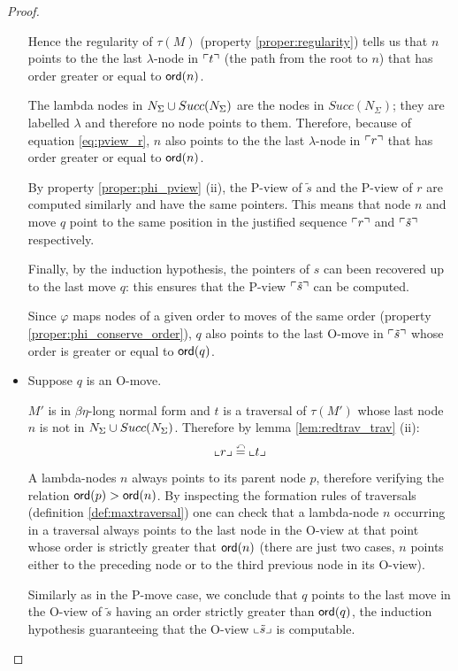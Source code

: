 \begin{proof}
\begin{itemize}
Hence the regularity of $\tau(M)$ (property \ref{proper:regularity}) tells us that $n$ points to the
the last $\lambda$-node in $\ulcorner t \urcorner$ (the path from the root to $n$) that has order greater or equal to ${\sf ord}(n)$.

The lambda nodes in $N_\Sigma \cup Succ(N_\Sigma)$ are the nodes in $Succ(N_{\Sigma})$; they are
labelled $\lambda$ and therefore no node points to them. Therefore, because of equation \ref{eq:pview_r},
$n$ also points to the the last $\lambda$-node in $\ulcorner r \urcorner$ that
has order greater or equal to ${\sf ord}(n)$.


By property \ref{proper:phi_pview} (ii), the P-view of $\tilde{s}$ and the P-view of $r$ are computed
similarly and have the same pointers. This means that
node $n$ and  move $q$ point to the same position in
the justified sequence $\ulcorner r \urcorner$ and $\ulcorner \tilde{s} \urcorner$ respectively.

Finally, by the induction hypothesis, the pointers of $s$ can been recovered up to the last move $q$: this
ensures that the P-view $\ulcorner \tilde{s} \urcorner$ can be computed.

Since $\varphi$ maps nodes of a given order to moves of the same order (property \ref{proper:phi_conserve_order}),
$q$ also points to the last O-move in $\ulcorner \tilde{s} \urcorner$ whose
order is greater or equal to ${\sf ord}(q)$.

\item Suppose $q$ is an O-move.

$M'$ is in $\beta\eta$-long normal form and $t$ is a traversal of $\tau(M')$
whose last node $n$ is not in $N_\Sigma \cup Succ(N_\Sigma)$. Therefore  by lemma \ref{lem:redtrav_trav} (ii):
\begin{equation}
 \llcorner r \lrcorner \stackrel{\curvearrowleft}{=} \llcorner t \lrcorner \label{eq:oview_r}
\end{equation}


A lambda-nodes $n$ always points to its parent node $p$, therefore verifying the relation ${\sf ord}(p) > {\sf ord}(n)$.
By inspecting the formation rules of traversals (definition \ref{def:maxtraversal}) one can check that
a lambda-node $n$ occurring in a traversal always points to the last node in the O-view at that point
whose order is strictly greater that ${\sf ord}(n)$ (there are just two cases,
$n$ points either to the preceding node or to the third previous node in its O-view).

Similarly as in the P-move case, we conclude that $q$ points to the last move in
the O-view of $\tilde{s}$ having an order strictly greater than ${\sf ord}(q)$,
the induction hypothesis guaranteeing that the O-view $\llcorner \tilde{s} \lrcorner$ is computable.

\end{itemize}

\end{proof}
